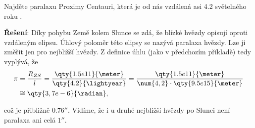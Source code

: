 \begin{mdframed}[style=mdexam]
  \begin{example}\label{FYZ:exam006}
    Najděte paralaxu Proximy Centauri, která je od nás vzdálená asi \num{4.2} světelného roku 
    \cite[s.~4]{Kulhanek2009}.
    
    {\centering
      \captionsetup{type=figure}
      \label{fyz:fig0225}
    \par}
      
    \textbf{Řešení}: Díky pohybu Země kolem Slunce se zdá, že blízké hvězdy opisují oproti 
    vzdáleným elipsu. Úhlový poloměr této elipsy se nazývá paralaxa hvězdy. Lze ji změřit jen pro 
    nejbližší hvězdy. Z definice úhlu (jako v předchozím příkladě) tedy vyplývá, že
    \begin{align*}
      \pi &= \frac{R_{ZS}}{l} = \frac{\qty{1.5e11}{\meter}}{\qty{4.2}{\lightyear}} 
           = \frac{\qty{1.5e11}{\meter}}{\num{4,2}\cdot\qty{9.5e15}{\meter}}   \\
          &\cong \qty{3,7e-6}{\radian},
    \end{align*}
    
    což je přibližně \(\ang{;;0,76}\). Vidíme, že i u druhé nejbližší hvězdy po Slunci není 
    paralaxa ani celá \(\ang{;;1}\).
  \end{example}
\end{mdframed}